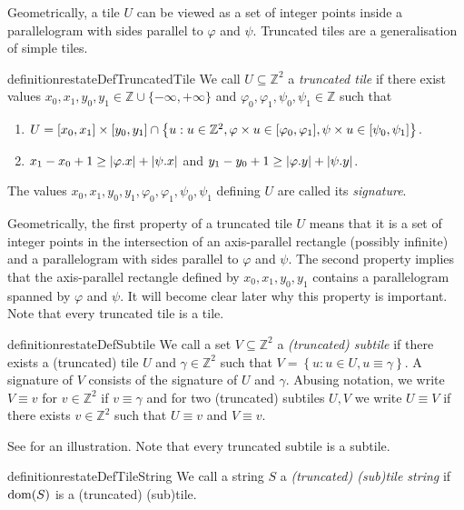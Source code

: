 \documentclass[twoside,leqno]{article}
\newcommand{\Z}{\mathbb{Z}}
\renewcommand{\phi}{\varphi}
\newcommand{\set}[1]{\left\lbrace #1 \right\rbrace}
\newcommand{\absolute}[1]{\left\lvert#1\right\rvert}
\begin{document}
Geometrically, a tile $U$ can be viewed as a set of integer points inside a parallelogram with sides parallel to $\phi$ and $\psi$. Truncated tiles are a generalisation of simple tiles. 

\begin{restatable*}{definition}{restateDefTruncatedTile}
We call $U \subseteq \Z^2$ a \emph{truncated tile} if there exist values $x_0, x_1, y_0, y_1 \in \Z \cup \{-\infty, +\infty\}$ and $\phi_0, \phi_1, \psi_0, \psi_1 \in \Z$ such that 
	\begin{enumerate}
		\item $U = [x_0, x_1] \times [y_0, y_1] \cap \set{u : u \in \Z^2, \h{u} \in [\phi_0, \phi_1], \s{u} \in [\psi_0, \psi_1]}$. 
		\item $x_1 - x_0 + 1 \ge \absolute{\x{\phi}} + \absolute{\x{\psi}}$ and $y_1 - y_0 + 1 \ge \absolute{\y{\phi}} + \absolute{\y{\psi}}$. 
	\end{enumerate}
The values $x_0, x_1, y_0, y_1, \phi_0, \phi_1, \psi_0, \psi_1$ defining $U$ are called its \emph{signature}. 
\end{restatable*}

Geometrically, the first property of a truncated tile $U$ means that it is a set of integer points in the intersection of an axis-parallel rectangle (possibly infinite) and a parallelogram with sides parallel to $\phi$ and $\psi$. The second property implies that the axis-parallel rectangle defined by $x_0, x_1, y_0, y_1$ contains a parallelogram spanned by $\phi$ and $\psi$. It will become clear later why this property is important. Note that every truncated tile is a tile.

\begin{restatable*}[Subtile]{definition}{restateDefSubtile}\label{subtile_definition}
We call a set $V \subseteq \Z^2$ a \emph{(truncated) subtile} if there exists a (truncated) tile $U$ and $\gamma \in \Z^2$ such that $V = \set{u : u \in U, u \equiv \gamma}$. A signature of $V$ consists of the signature of $U$ and $\gamma$. Abusing notation, we write $V \equiv v$ for $v \in \Z^2$ if $v \equiv \gamma$ and for two (truncated) subtiles $U,V$ we write $U \equiv V$ if there exists $v \in \Z^2$ such that $U \equiv v$ and $V \equiv v$.
\end{restatable*}

See  for an illustration. Note that every truncated subtile is a subtile.

\begin{restatable*}{definition}{restateDefTileString}\label{tile_string_definition}
We call a string $S$ a \emph{(truncated) (sub)tile string} if $\operatorname*{dom}(S)$ is a (truncated) (sub)tile.
\end{restatable*}
\end{document}

